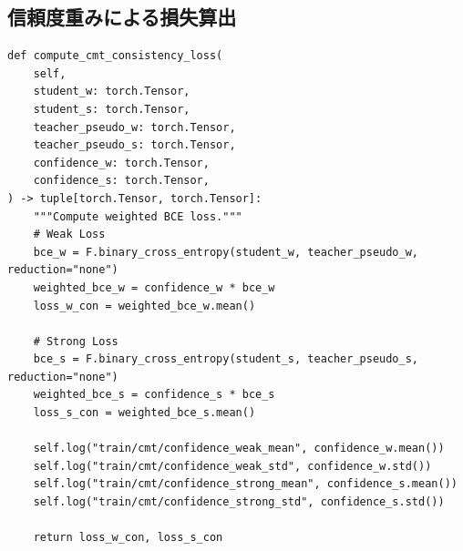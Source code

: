 \documentclass[../main.tex]{subfiles}
\begin{document}
\subsection{信頼度重みによる損失算出}
\begin{verbatim}
def compute_cmt_consistency_loss(
    self,
    student_w: torch.Tensor,
    student_s: torch.Tensor,
    teacher_pseudo_w: torch.Tensor,
    teacher_pseudo_s: torch.Tensor,
    confidence_w: torch.Tensor,
    confidence_s: torch.Tensor,
) -> tuple[torch.Tensor, torch.Tensor]:
    """Compute weighted BCE loss."""
    # Weak Loss
    bce_w = F.binary_cross_entropy(student_w, teacher_pseudo_w, reduction="none")
    weighted_bce_w = confidence_w * bce_w
    loss_w_con = weighted_bce_w.mean()

    # Strong Loss
    bce_s = F.binary_cross_entropy(student_s, teacher_pseudo_s, reduction="none")
    weighted_bce_s = confidence_s * bce_s
    loss_s_con = weighted_bce_s.mean()

    self.log("train/cmt/confidence_weak_mean", confidence_w.mean())
    self.log("train/cmt/confidence_weak_std", confidence_w.std())
    self.log("train/cmt/confidence_strong_mean", confidence_s.mean())
    self.log("train/cmt/confidence_strong_std", confidence_s.std())

    return loss_w_con, loss_s_con
\end{verbatim}
\end{document}
